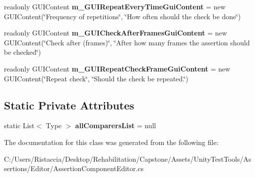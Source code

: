 \begin{DoxyCompactItemize}
readonly G\+U\+I\+Content {\bfseries m\+\_\+\+G\+U\+I\+Repeat\+Every\+Time\+Gui\+Content} = new G\+U\+I\+Content(\char`\"{}Frequency of repetitions\char`\"{}, \char`\"{}How often should the check be done\char`\"{})
\item 
\mbox{\label{class_unity_test_1_1_assertion_component_editor_a5c63f63a57305e887cc1935a97f6a178}} 
readonly G\+U\+I\+Content {\bfseries m\+\_\+\+G\+U\+I\+Check\+After\+Frames\+Gui\+Content} = new G\+U\+I\+Content(\char`\"{}Check after (frames)\char`\"{}, \char`\"{}After how many frames the assertion should be checked\char`\"{})
\item 
\mbox{\label{class_unity_test_1_1_assertion_component_editor_aad38570d5511960dfce3f60b46da8443}} 
readonly G\+U\+I\+Content {\bfseries m\+\_\+\+G\+U\+I\+Repeat\+Check\+Frame\+Gui\+Content} = new G\+U\+I\+Content(\char`\"{}Repeat check\char`\"{}, \char`\"{}Should the check be repeated.\char`\"{})
\end{DoxyCompactItemize}
\subsection*{Static Private Attributes}
\begin{DoxyCompactItemize}
\item 
\mbox{\label{class_unity_test_1_1_assertion_component_editor_a47cfdbaaca1106ab3f480c90412f0c0b}} 
static List$<$ Type $>$ {\bfseries all\+Comparers\+List} = null
\end{DoxyCompactItemize}


The documentation for this class was generated from the following file\+:\begin{DoxyCompactItemize}
\item 
C\+:/\+Users/\+Ristaccia/\+Desktop/\+Rehabilitation/\+Capstone/\+Assets/\+Unity\+Test\+Tools/\+Assertions/\+Editor/Assertion\+Component\+Editor.\+cs\end{DoxyCompactItemize}
